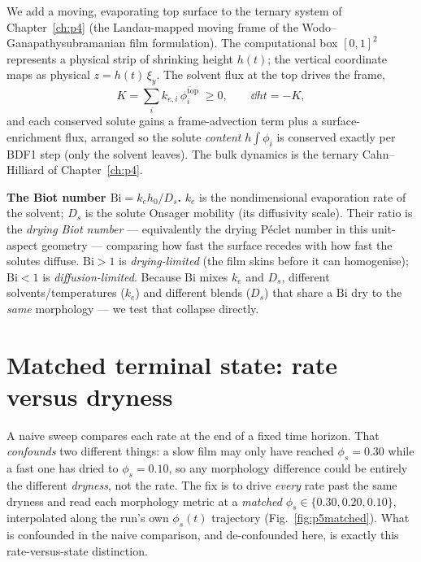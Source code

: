 We add a moving, evaporating top surface to the ternary system of
Chapter~\ref{ch:p4} (the Landau-mapped moving frame of the
Wodo--Ganapathysubramanian film formulation). The computational box
$[0,1]^2$ represents a physical strip of shrinking height $h(t)$; the
vertical coordinate maps as physical $z = h(t)\,\xi_y$. The solvent flux
at the top drives the frame,
%
\begin{equation}
  K = \sum_i k_{e,i}\,\overline{\phi_i^{\text{top}}} \;\ge 0,
  \qquad \dd{h}{t} = -K ,
  \label{eq:p5film}
\end{equation}
%
and each conserved solute gains a frame-advection term plus a surface-
enrichment flux, arranged so the solute \emph{content} $h\!\int\phi_i$ is
conserved exactly per BDF1 step (only the solvent leaves). The bulk
dynamics is the ternary Cahn--Hilliard of Chapter~\ref{ch:p4}.

\begin{keybox}
\textbf{The Biot number $\mathrm{Bi}=k_e h_0/D_s$.} $k_e$ is the
nondimensional evaporation rate of the solvent; $D_s$ is the solute
Onsager mobility (its diffusivity scale). Their ratio is the
\emph{drying Biot number} --- equivalently the drying P\'eclet number in
this unit-aspect geometry --- comparing how fast the surface recedes with
how fast the solutes diffuse. $\mathrm{Bi}>1$ is \emph{drying-limited}
(the film skins before it can homogenise); $\mathrm{Bi}<1$ is
\emph{diffusion-limited}. Because $\mathrm{Bi}$ mixes $k_e$ and $D_s$,
different solvents/temperatures ($k_e$) and different blends ($D_s$) that
share a $\mathrm{Bi}$ dry to the \emph{same} morphology --- we test that
collapse directly.
\end{keybox}

\section{Matched terminal state: rate versus dryness}

A naive sweep compares each rate at the end of a fixed time horizon. That
\emph{confounds} two different things: a slow film may only have reached
$\phi_s=0.30$ while a fast one has dried to $\phi_s=0.10$, so any
morphology difference could be entirely the different \emph{dryness}, not
the rate. The fix is to drive \emph{every} rate past the same dryness and
read each morphology metric at a \emph{matched} $\phi_s\in\{0.30,0.20,
0.10\}$, interpolated along the run's own $\phi_s(t)$ trajectory
(Fig.~\ref{fig:p5matched}). What is confounded in the naive comparison,
and de-confounded here, is exactly this rate-versus-state distinction.

